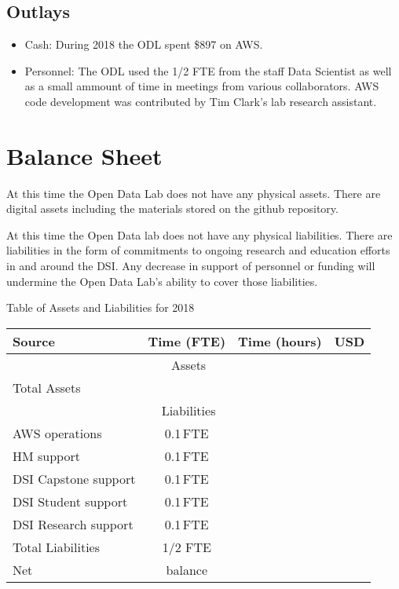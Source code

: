 \subsection{Outlays}
\begin{itemize}
\item Cash: During 2018 the ODL spent \$897 on AWS.
\item Personnel: The ODL used the 1/2 FTE from the staff Data Scientist as well as a small ammount of time in meetings from various collaborators. AWS code development was contributed by Tim Clark's lab research assistant.
\end{itemize}

\section{Balance Sheet} %
At this time the Open Data Lab does not have any physical assets. There are digital assets including the materials stored on the github repository.

At this time the Open Data lab does not have any physical liabilities. There are liabilities in the form of commitments to ongoing research and education efforts in and around the DSI. Any decrease in support of personnel or funding will undermine the Open Data Lab's ability to cover those liabilities.

\begin{center}
Table of Assets and Liabilities for 2018

\begin{tabular}{lccr}
\hline
\hline
Source & Time (FTE) & Time (hours) & USD \\
\hline
\multicolumn{4}{c}{Assets} \\
\hline
\hline
Total Assets &  &  &  \\
\hline
\hline
\multicolumn{4}{c}{Liabilities} \\
\hline
AWS operations & 0.1\,FTE & &  \\
HM support & 0.1\,FTE &  & \\
DSI Capstone support & 0.1\,FTE & & \\
DSI Student support & 0.1\,FTE & & \\
DSI Research support & 0.1\,FTE & & \\
\hline
Total Liabilities & 1/2 FTE &  &  \\
\hline
\hline
Net & balance &  &  \\
\hline
\hline
\end{tabular}
\end{center}

